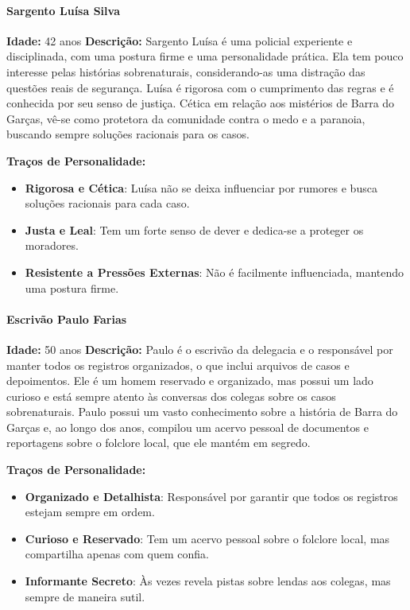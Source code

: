 \begin{personagem}  
\paragraph{Sargento Luísa Silva}  
\textbf{Idade:} 42 anos  
\textbf{Descrição:}  
Sargento Luísa é uma policial experiente e disciplinada, com uma postura firme e uma personalidade prática. Ela tem pouco interesse pelas histórias sobrenaturais, considerando-as uma distração das questões reais de segurança. Luísa é rigorosa com o cumprimento das regras e é conhecida por seu senso de justiça. Cética em relação aos mistérios de Barra do Garças, vê-se como protetora da comunidade contra o medo e a paranoia, buscando sempre soluções racionais para os casos.

\textbf{Traços de Personalidade:}
\begin{itemize}
    \item \textbf{Rigorosa e Cética}: Luísa não se deixa influenciar por rumores e busca soluções racionais para cada caso.
    \item \textbf{Justa e Leal}: Tem um forte senso de dever e dedica-se a proteger os moradores.
    \item \textbf{Resistente a Pressões Externas}: Não é facilmente influenciada, mantendo uma postura firme.
\end{itemize}
\end{personagem}
\begin{personagem}  
\paragraph{Escrivão Paulo Farias}  
\textbf{Idade:} 50 anos  
\textbf{Descrição:}  
Paulo é o escrivão da delegacia e o responsável por manter todos os registros organizados, o que inclui arquivos de casos e depoimentos. Ele é um homem reservado e organizado, mas possui um lado curioso e está sempre atento às conversas dos colegas sobre os casos sobrenaturais. Paulo possui um vasto conhecimento sobre a história de Barra do Garças e, ao longo dos anos, compilou um acervo pessoal de documentos e reportagens sobre o folclore local, que ele mantém em segredo.

\textbf{Traços de Personalidade:}
\begin{itemize}
    \item \textbf{Organizado e Detalhista}: Responsável por garantir que todos os registros estejam sempre em ordem.
    \item \textbf{Curioso e Reservado}: Tem um acervo pessoal sobre o folclore local, mas compartilha apenas com quem confia.
    \item \textbf{Informante Secreto}: Às vezes revela pistas sobre lendas aos colegas, mas sempre de maneira sutil.
\end{itemize}
\end{personagem}
